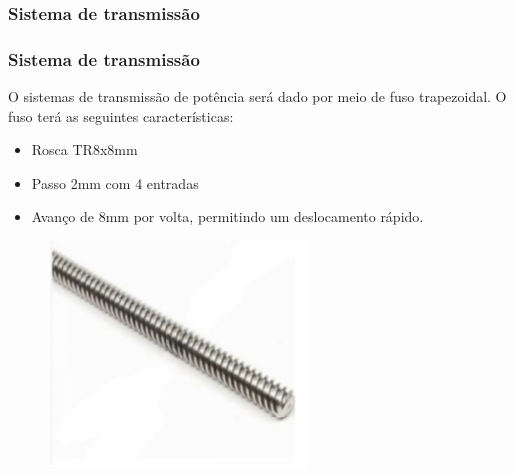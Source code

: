 \subsubsection{Sistema de transmissão}

\begin{frame}
\frametitle{Sistema de transmissão}

O sistemas de transmissão de potência  será dado por meio de fuso trapezoidal. 
O fuso terá as seguintes características:

\begin{itemize}
    \item Rosca TR8x8mm
    \item Passo 2mm com 4 entradas
    \item Avanço de 8mm por volta,  permitindo um deslocamento rápido.  
\end{itemize}

\begin{figure}
\centering
\includegraphics[scale = 0.8]{figs/fusotrapezoidal}
\end{figure}
    
\end{frame}
